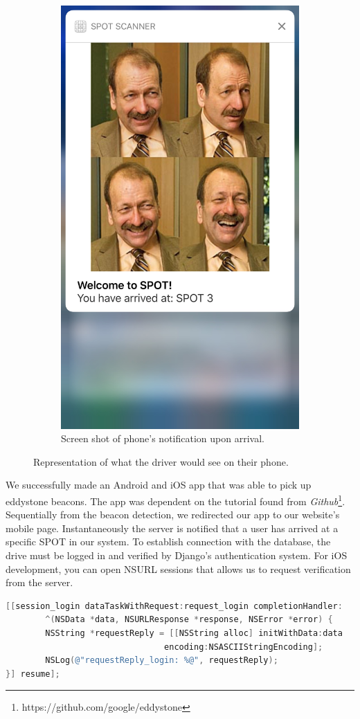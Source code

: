 \begin{figure}
\begin{subfigure}{.4\textwidth}
  \includegraphics[width=0.6\linewidth]{pictures/blummy.jpeg}
  \caption{Screen shot of phone's notification upon arrival.}
\end{subfigure}
\caption{Representation of what the driver would see on their phone.}
\end{figure}
We successfully made an Android and iOS app that was able to pick up eddystone beacons.
The app was dependent on the tutorial found from \textit{Github}\footnote{https://github.com/google/eddystone}.
Sequentially from the beacon detection, we redirected our app to our website's mobile page.
Instantaneously the server is notified that a user has arrived at a specific SPOT in our system.
To establish connection with the database, the drive must be logged in and verified by Django's authentication system.
For iOS development, you can open NSURL sessions that allows us to request verification from the server.
\begin{lstlisting}[language=C]
[[session_login dataTaskWithRequest:request_login completionHandler:
        ^(NSData *data, NSURLResponse *response, NSError *error) {
        NSString *requestReply = [[NSString alloc] initWithData:data 
                                encoding:NSASCIIStringEncoding];
        NSLog(@"requestReply_login: %@", requestReply);
}] resume];
\end{lstlisting}
